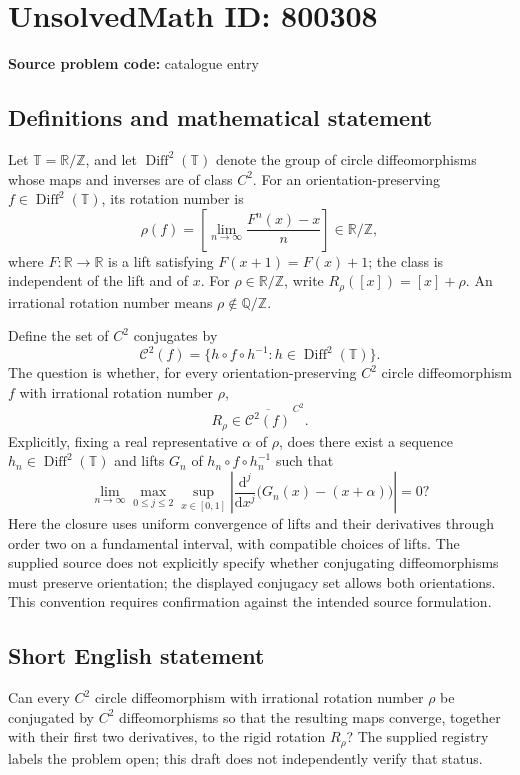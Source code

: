 \documentclass[11pt]{article}
\newcommand{\Z}{\mathbb{Z}}
\newcommand{\Q}{\mathbb{Q}}
\newcommand{\R}{\mathbb{R}}
\begin{document}
\section*{UnsolvedMath ID: 800308}
\textbf{Source problem code:} catalogue entry
\subsection{Definitions and mathematical statement}
Let \(\mathbb T=\R/\Z\), and let \(\operatorname{Diff}^{2}(\mathbb T)\) denote the group of circle diffeomorphisms whose maps and inverses are of class \(C^{2}\). For an orientation-preserving \(f\in\operatorname{Diff}^{2}(\mathbb T)\), its rotation number is
\[
\rho(f)=\left[\lim_{n\to\infty}\frac{F^{n}(x)-x}{n}\right]\in\R/\Z,
\]
where \(F:\R\to\R\) is a lift satisfying \(F(x+1)=F(x)+1\); the class is independent of the lift and of \(x\). For \(\rho\in\R/\Z\), write \(R_{\rho}([x])=[x]+\rho\). An irrational rotation number means \(\rho\notin\Q/\Z\).

Define the set of \(C^{2}\) conjugates by
\[
\mathcal C^{2}(f)=\{h\circ f\circ h^{-1}:h\in\operatorname{Diff}^{2}(\mathbb T)\}.
\]
The question is whether, for every orientation-preserving \(C^{2}\) circle diffeomorphism \(f\) with irrational rotation number \(\rho\),
\[
R_{\rho}\in\overline{\mathcal C^{2}(f)}^{\,C^{2}}.
\]
Explicitly, fixing a real representative \(\alpha\) of \(\rho\), does there exist a sequence \(h_n\in\operatorname{Diff}^{2}(\mathbb T)\) and lifts \(G_n\) of \(h_n\circ f\circ h_n^{-1}\) such that
\[
\lim_{n\to\infty}\max_{0\leq j\leq 2}\sup_{x\in[0,1]}
\left|\frac{\mathrm d^{j}}{\mathrm dx^{j}}\bigl(G_n(x)-(x+\alpha)\bigr)\right|=0?
\]
Here the closure uses uniform convergence of lifts and their derivatives through order two on a fundamental interval, with compatible choices of lifts. The supplied source does not explicitly specify whether conjugating diffeomorphisms must preserve orientation; the displayed conjugacy set allows both orientations. This convention requires confirmation against the intended source formulation.
\subsection{Short English statement}
Can every \(C^{2}\) circle diffeomorphism with irrational rotation number \(\rho\) be conjugated by \(C^{2}\) diffeomorphisms so that the resulting maps converge, together with their first two derivatives, to the rigid rotation \(R_{\rho}\)? The supplied registry labels the problem open; this draft does not independently verify that status.
\end{document}
